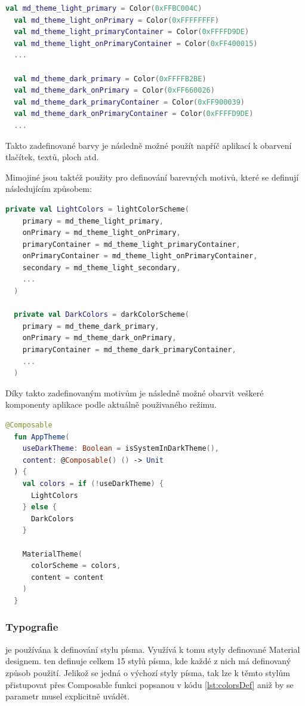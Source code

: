 \begin{lstlisting}[caption={Zadefinování barev}, label={lst:ComposeCode}, language=Kotlin]
  val md_theme_light_primary = Color(0xFFBC004C)
  val md_theme_light_onPrimary = Color(0xFFFFFFFF)
  val md_theme_light_primaryContainer = Color(0xFFFFD9DE)
  val md_theme_light_onPrimaryContainer = Color(0xFF400015)
  ...

  val md_theme_dark_primary = Color(0xFFFFB2BE)
  val md_theme_dark_onPrimary = Color(0xFF660026)
  val md_theme_dark_primaryContainer = Color(0xFF900039)
  val md_theme_dark_onPrimaryContainer = Color(0xFFFFD9DE)
  ...
\end{lstlisting}

Takto zadefinované barvy je následně možné použít napříč aplikací k obarvení tlačítek, textů, ploch atd.

Mimojiné jsou taktéž použity pro definování barevných motivů, které se definují následujícím způsobem:

\begin{lstlisting}[caption={Definice barevných motivů}, label={lst:ComposeCode}, language=Kotlin]
  private val LightColors = lightColorScheme(
    primary = md_theme_light_primary,
    onPrimary = md_theme_light_onPrimary,
    primaryContainer = md_theme_light_primaryContainer,
    onPrimaryContainer = md_theme_light_onPrimaryContainer,
    secondary = md_theme_light_secondary,
    ...
  )

  private val DarkColors = darkColorScheme(
    primary = md_theme_dark_primary,
    onPrimary = md_theme_dark_onPrimary,
    primaryContainer = md_theme_dark_primaryContainer,
    ...
  )
\end{lstlisting}

Díky takto zadefinovaným motivům je následně možné obarvit veškeré komponenty aplikace podle aktuálně použivaného režimu.

\begin{lstlisting}[caption={Definice barevných motivů}, label={lst:colorsDef}, language=Kotlin]
  @Composable
  fun AppTheme(
    useDarkTheme: Boolean = isSystemInDarkTheme(),
    content: @Composable() () -> Unit
  ) {
    val colors = if (!useDarkTheme) {
      LightColors
    } else {
      DarkColors
    }
  
    MaterialTheme(
      colorScheme = colors,
      content = content
    )
  }
\end{lstlisting}

\subsubsection{Typografie}
je používána k definování stylu písma. Využívá k tomu styly definované Material designem. ten definuje celkem 15 stylů písma,
kde každé z nich má definovaný způsob použití. \cite{material3} Jelikož se jedná o výchozí styly písma, tak lze k těmto stylům přistupovat přes
Composable funkci  popsanou v kódu \ref{lst:colorsDef} aniž by se parametr  musel explicitně
uvádět.

